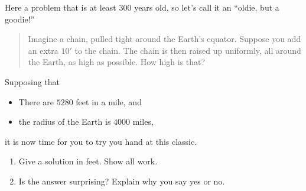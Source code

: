 \documentclass[noauthor,nooutcomes,handout]{ximera}
\begin{document}
\begin{question}
  Here a problem that is at least $300$ years old, so let's call it an  ``oldie, but a goodie!''
  \begin{quote}
    Imagine a chain, pulled tight around the Earth's equator. Suppose
   you add an extra $10'$ to the chain. The chain is then raised up
    uniformly, all around the Earth, as high as possible. How high is    that?
  \end{quote}
  Supposing that
  \begin{itemize}
  \item There are $5280$ feet in a mile, and
  \item the radius of the Earth is $4000$ miles,
  \end{itemize}
  it is now time for you to try you hand at this classic.
  \begin{enumerate}
  \item Give a solution in feet. Show all work.
  \item Is the answer surprising? Explain why you say yes or no.
  \end{enumerate}
\end{question}
\end{document}
